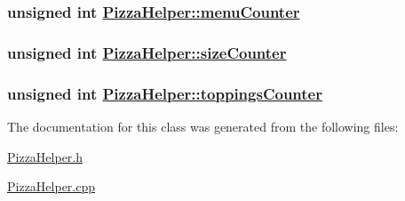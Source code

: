 \hypertarget{class_pizza_helper_e91a67288d9c8eaaa93feeebcfbd1d10}{
\subsubsection[menuCounter]{\setlength{\rightskip}{0pt plus 5cm}unsigned int \hyperlink{class_pizza_helper_e91a67288d9c8eaaa93feeebcfbd1d10}{Pizza\-Helper::menu\-Counter}}}
\label{class_pizza_helper_e91a67288d9c8eaaa93feeebcfbd1d10}


\hypertarget{class_pizza_helper_00e1b751a8e3e1d3b531bbbcd4e40948}{
\subsubsection[sizeCounter]{\setlength{\rightskip}{0pt plus 5cm}unsigned int \hyperlink{class_pizza_helper_00e1b751a8e3e1d3b531bbbcd4e40948}{Pizza\-Helper::size\-Counter}}}
\label{class_pizza_helper_00e1b751a8e3e1d3b531bbbcd4e40948}


\hypertarget{class_pizza_helper_450c3826ea82a6622f93e6bdcc939268}{
\subsubsection[toppingsCounter]{\setlength{\rightskip}{0pt plus 5cm}unsigned int \hyperlink{class_pizza_helper_450c3826ea82a6622f93e6bdcc939268}{Pizza\-Helper::toppings\-Counter}}}
\label{class_pizza_helper_450c3826ea82a6622f93e6bdcc939268}




The documentation for this class was generated from the following files:\begin{CompactItemize}
\item 
\hyperlink{_pizza_helper_8h}{Pizza\-Helper.h}\item 
\hyperlink{_pizza_helper_8cpp}{Pizza\-Helper.cpp}\end{CompactItemize}
